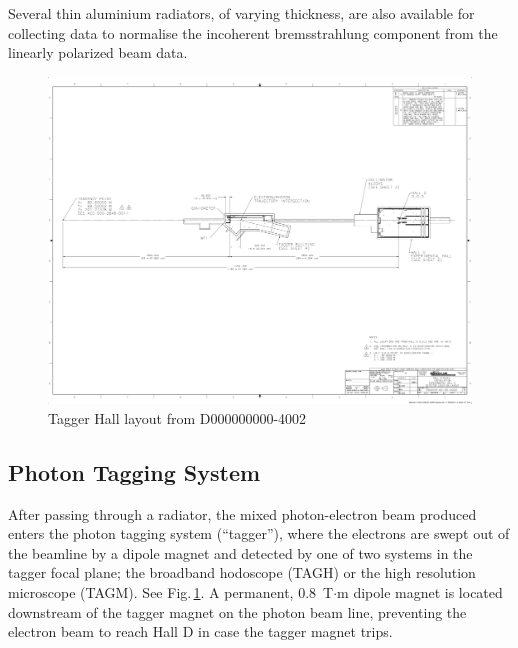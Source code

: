 

Several thin aluminium radiators, of varying thickness, are also available for collecting data to normalise the incoherent bremsstrahlung component from the linearly polarized beam data.

\begin{figure}[ht]
\begin{center}
   \includegraphics[page=4,viewport=581 1311 3020 2340,clip,angle=0,width=0.98\linewidth]{figures/D000000000-4002_RevB}
\end{center}
\caption{Tagger Hall layout
         from D000000000-4002
        }
\label{fig:beam:tagger-hall} 
\end{figure}

\subsection{Photon Tagging System \label{sec:tag}}
After passing through a radiator, the mixed photon-electron beam produced enters the photon tagging system (``tagger''), where the electrons are swept out of the beamline by a dipole magnet and detected by one of two systems in the tagger focal plane; the broadband hodoscope (TAGH) or the high resolution microscope (TAGM).
See Fig.\,\ref{fig:beam:tagger-hall}.
A permanent, 0.8~T$\cdot$m dipole magnet is located
downstream of the tagger magnet on the photon beam line, preventing
the electron beam to reach Hall D in case the tagger magnet trips.

